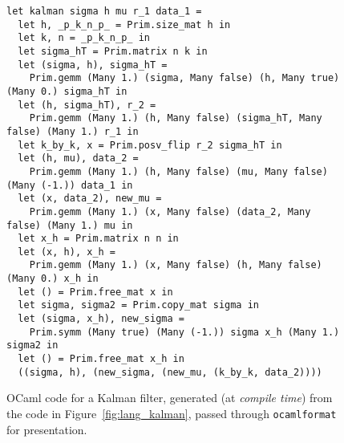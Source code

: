 \vspace*{\fill}
\begin{figure}[h]
\begin{center}
    \begin{verbatim}
let kalman sigma h mu r_1 data_1 =
  let h, _p_k_n_p_ = Prim.size_mat h in
  let k, n = _p_k_n_p_ in
  let sigma_hT = Prim.matrix n k in
  let (sigma, h), sigma_hT =
    Prim.gemm (Many 1.) (sigma, Many false) (h, Many true) (Many 0.) sigma_hT in
  let (h, sigma_hT), r_2 =
    Prim.gemm (Many 1.) (h, Many false) (sigma_hT, Many false) (Many 1.) r_1 in
  let k_by_k, x = Prim.posv_flip r_2 sigma_hT in
  let (h, mu), data_2 =
    Prim.gemm (Many 1.) (h, Many false) (mu, Many false) (Many (-1.)) data_1 in
  let (x, data_2), new_mu =
    Prim.gemm (Many 1.) (x, Many false) (data_2, Many false) (Many 1.) mu in
  let x_h = Prim.matrix n n in
  let (x, h), x_h =
    Prim.gemm (Many 1.) (x, Many false) (h, Many false) (Many 0.) x_h in
  let () = Prim.free_mat x in
  let sigma, sigma2 = Prim.copy_mat sigma in
  let (sigma, x_h), new_sigma =
    Prim.symm (Many true) (Many (-1.)) sigma x_h (Many 1.) sigma2 in
  let () = Prim.free_mat x_h in
  ((sigma, h), (new_sigma, (new_mu, (k_by_k, data_2))))
    \end{verbatim}
    \caption{OCaml code for a Kalman filter, generated (at \emph{compile time})
        from the code in Figure~\ref{fig:lang_kalman}, passed through
        \texttt{ocamlformat} for presentation.}\label{fig:ocaml_kalman}
\end{center}
\end{figure}
\vfill

